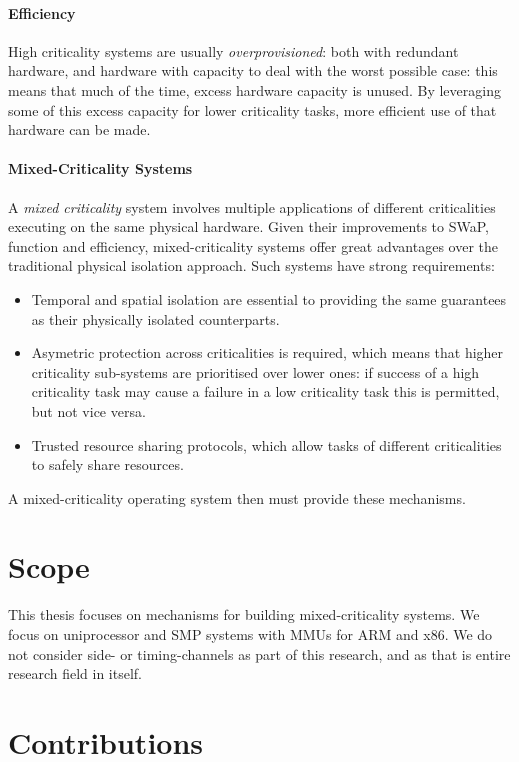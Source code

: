 
\paragraph{Efficiency}

High criticality systems are usually \emph{overprovisioned}: both with redundant hardware, and hardware with capacity to deal with the worst possible case: this means that much of the time, excess hardware capacity is unused. 
By leveraging some of this excess capacity for lower criticality tasks, more efficient use of that hardware can be made.

\paragraph{Mixed-Criticality Systems}

A \emph{mixed criticality} system involves multiple applications of different criticalities executing on the same physical hardware. 
Given their improvements to \gls{SWaP}, function and efficiency, mixed-criticality systems offer great advantages over the traditional physical isolation approach. 
Such systems have strong requirements:

\begin{itemize}
\item Temporal and spatial isolation are essential to providing the same guarantees as their physically isolated counterparts.
\item Asymetric protection across criticalities is required, which means that higher criticality sub-systems are prioritised over lower ones: if success of a high criticality task may cause a failure in a low criticality task this is permitted, but not vice versa.
\item Trusted resource sharing protocols, which allow tasks of different criticalities to safely share resources.
\end{itemize}

A mixed-criticality operating system then must provide these mechanisms. 


\section{Scope}

This thesis focuses on mechanisms for building mixed-criticality systems. 
We focus on uniprocessor and \gls{SMP} systems with \glspl{MMU} for ARM and x86.
We do not consider side- or timing-channels as part of this research, and as that is entire research field in itself.

\section{Contributions}






